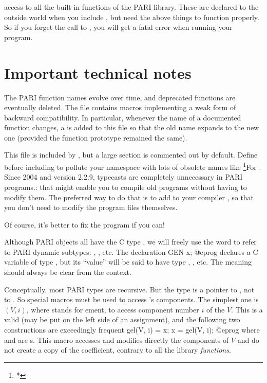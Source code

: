 \item access to all the built-in functions of the PARI library.
These are declared to the outside world when you include , but
need the above things to function properly. So if you forget the call to
, you will get a fatal error when running your program.

\section{Important technical notes}

 The PARI function names evolve over time,
and deprecated functions are eventually deleted.  The file 
contains macros implementing a weak form of backward compatibility.
In particular, whenever the name of a documented function changes, a
 is added to this file so that the old name expands to the new
one (provided the function prototype remained the same).

This file is included by , but a large section is commented out
by default. Define  before including  to
pollute your namespace with lots of obsolete names like
\footnote{*}{For . Since 2004 and version 2.2.9,
typecasts are completely unnecessary in PARI programs.}: that might enable
you to compile old programs without having to modify them. The preferred way
to do that is to add  to your compiler ,
so that you don't need to modify the program files themselves.

Of course, it's better to fix the program if you can!


\noindent
Although PARI objects all have the C type , we will freely use
the word  to refer to PARI dynamic subtypes: , ,
etc. The declaration
\bprog
  GEN x;
@eprog\noindent
declares a C variable of type , but its ``value'' will be said to
have type , , etc. The meaning should always be clear from
the context.


\noindent
Conceptually, most PARI types are recursive. But the  type is a
pointer to , not to . So special macros must be used to
access 's components. The simplest one is $(V, i)$, where
 stands for ement, to access component number $i$ of the
 $V$. This is a valid  (may be put on the left side of
an assignment), and the following two constructions are exceedingly frequent
%
\bprog
  gel(V, i) = x;
  x = gel(V, i);
@eprog\noindent
where  and  are s. This macro accesses and modifies
directly the components of $V$ and do not create a copy of the coefficient,
contrary to all the library \emph{functions}.

